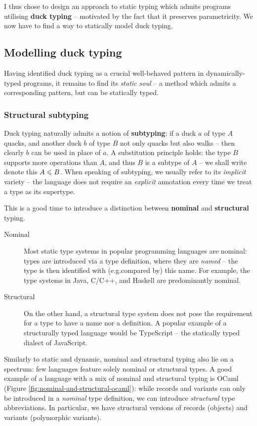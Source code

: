 I thus chose to design an approach to static typing which admits programs utilising \textbf{duck typing} -- motivated by the fact that it preserves parametricity. 
We now have to find a way to statically model duck typing.

\subsection{Modelling duck typing}
\label{subsec:duck-models}

Having identified duck typing as a crucial well-behaved pattern in dynamically-typed programs, it remains to find its \emph{static soul} -- a method which admits a corresponding pattern, but can be statically typed.

\subsubsection{Structural subtyping}

Duck typing naturally admits a notion of \textbf{subtyping}: if a duck $a$ of type $A$ quacks, and another duck $b$ of type $B$ not only quacks but also walks -- then clearly $b$ can be used in place of $a$. A substitution principle holds: the type $B$ supports more operations than $A$, and thus $B$ is a subtype of $A$ -- we shall write denote this $A \leqslant B$. When speaking of subtyping, we usually refer to its \emph{implicit} variety -- the language does not require an \emph{explicit} annotation every time we treat a type as its supertype.

This is a good time to introduce a distinction between \textbf{nominal} and \textbf{structural} typing. \begin{description}
    \item[Nominal] Most static type systems in popular programming languages are nominal: types are introduced via a type definition, where they are \emph{named} -- the type is then identified with (e.g.\@ compared by) this name. For example, the type systems in Java, C/C++, and Haskell are predominantly nominal.
    \item[Structural] On the other hand, a structural type system does not pose the requirement for a type to have a name nor a definition. A popular example of a structurally typed language would be TypeScript -- the statically typed dialect of JavaScript. 
\end{description}
Similarly to static and dynamic, nominal and structural typing also lie on a spectrum: few languages feature solely nominal or structural types. A good example of a language with a mix of nominal and structural typing is OCaml (Figure \ref{fig:nominal-and-structural-ocaml}): while records and variants can only be introduced in a \emph{nominal} type definition, we can introduce \emph{structural} type abbreviations. In particular, we have structural versions of records (objects) and variants (polymorphic variants).

